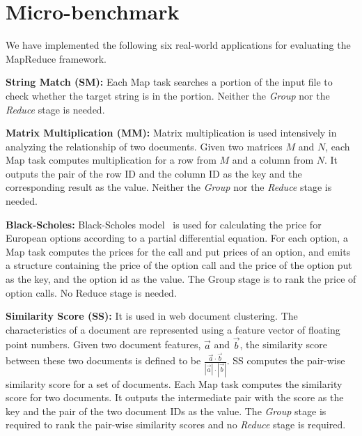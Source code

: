 \section{Micro-benchmark}

We have implemented the following six real-world applications for
evaluating the MapReduce framework.

{\bf String Match (SM):} Each Map task searches a portion of the
input file to check whether the target string is in the portion.
Neither the {\em Group} nor the {\em Reduce} stage is needed.

{\bf Matrix Multiplication (MM):} Matrix multiplication is used
intensively in analyzing the relationship of two documents. Given two
matrices $M$ and $N$, each Map task computes multiplication for a
row from $M$ and a column from $N$. It outputs the pair of the row
ID and the column ID as the key and the corresponding result as the
value. Neither the {\em Group} nor the {\em Reduce} stage is needed.


{\bf Black-Scholes:} Black-Scholes model~\cite{Black1973} is used for calculating the price for European options according to a partial differential equation.
For each option, a Map task computes the prices for the call and put prices of an option, and emits a structure containing the price of the option call and the price of the option put as the key, and the option id as the value. The Group stage is to rank the price of option calls. No Reduce stage is needed.


{\bf Similarity Score (SS):} It is used in web document clustering.
The characteristics of a document are represented using a feature
vector of floating point numbers. Given two document features,
$\vec{a}$ and $\vec{b}$, the similarity score between these two
documents is defined to be $\frac{\vec{a}\cdot
\vec{b}}{|\vec{a}|\cdot |\vec{b}|}$. SS computes the pair-wise
similarity score for a set of documents. Each Map task computes the
similarity score for two documents. It outputs the intermediate pair
with the score as the key and the pair of the two document IDs as the
value. The {\em Group} stage is required to rank the pair-wise similarity
scores and no {\em Reduce} stage is required. %

